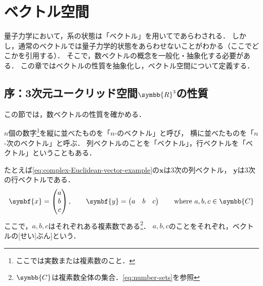 \documentclass[../sotsu.tex]{subfiles}
\begin{document}
\section{ベクトル空間}
\label{sec:vector-space}

量子力学において，系の状態は「ベクトル」を用いてであらわされる．
しかし，通常のベクトルでは量子力学的状態をあらわせないことがわかる（ここでどこかを引用する）．
そこで，数ベクトルの概念を一般化・抽象化する必要がある．
この章ではベクトルの性質を抽象化し，ベクトル空間について定義する．

\subsection*{序：3次元ユークリッド空間$\symbb{R}^3$の性質}

この節では，数ベクトルの性質を確かめる．

$n$個の数字\footnote{ここでは実数または複素数のこと．}を縦に並べたものを「$n$-のベクトル」と呼び，
横に並べたものを「$n$-次のベクトル」と呼ぶ\cite{miyake-lin-2008}．
列ベクトルのことを「ベクトル」，行ベクトルを「ベクトル」ということもある．

たとえば\cref{eq:complex-Euclidean-vector-example}の$\symbf{x}$は3次の列ベクトル，
$\symbf{y}$は3次の行ベクトルである．
\begin{align}
    \label{eq:complex-Euclidean-vector-example}
    \symbf{x} = 
    \begin{pmatrix}
        a  \\  b  \\  c
    \end{pmatrix}
    , \qquad
    \symbf{y} = 
    \begin{pmatrix}
        a  &  b  &  c
    \end{pmatrix}
    \qquad 
    \text{where $a, b, c \in \symbb{C}$}
\end{align}
ここで，$a, b, c$はそれぞれある複素数である\footnote{$\symbb{C}$は複素数全体の集合．\cref{eq:number-sets}を参照}．
$a, b, c$のことをそれぞれ，ベクトルの[せい|ぶん]という．
\end{document}
